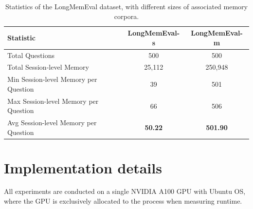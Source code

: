 \begin{table}[htbp]
\centering
\caption{Statistics of the LongMemEval dataset, with different sizes of associated memory corpora.}
\label{tab:longmemeval_stats_vertical}
\begin{tabular}{lcc}
\toprule
\textbf{Statistic} & \textbf{LongMemEval-s} & \textbf{LongMemEval-m} \\
\midrule
Total Questions & 500 & 500 \\
Total Session-level Memory & 25,112 & 250,948 \\
Min Session-level Memory per Question & 39 & 501 \\
Max Session-level Memory per Question & 66 & 506 \\
Avg Session-level Memory per Question & \textbf{50.22} & \textbf{501.90} \\
\bottomrule
\end{tabular}
\end{table}



\section{Implementation details}
\label{app:imple}
All experiments are conducted on a single NVIDIA A100 GPU with Ubuntu OS, where the GPU is exclusively allocated to the process when measuring runtime. 

